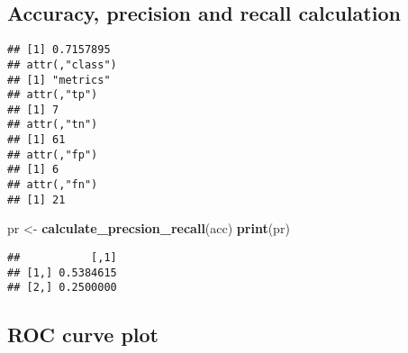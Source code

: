 \documentclass[
]{article}
\newenvironment{Shaded}{\begin{snugshade}}{\end{snugshade}}
\newcommand{\AttributeTok}[1]{\textcolor[rgb]{0.13,0.29,0.53}{#1}}
\newcommand{\DecValTok}[1]{\textcolor[rgb]{0.00,0.00,0.81}{#1}}
\newcommand{\FloatTok}[1]{\textcolor[rgb]{0.00,0.00,0.81}{#1}}
\newcommand{\FunctionTok}[1]{\textcolor[rgb]{0.13,0.29,0.53}{\textbf{#1}}}
\newcommand{\NormalTok}[1]{#1}
\newcommand{\OtherTok}[1]{\textcolor[rgb]{0.56,0.35,0.01}{#1}}
\newcommand{\SpecialCharTok}[1]{\textcolor[rgb]{0.81,0.36,0.00}{\textbf{#1}}}
\begin{document}
\hypertarget{accuracy-precision-and-recall-calculation}{%
\subsection{Accuracy, precision and recall
calculation}\label{accuracy-precision-and-recall-calculation}}

\begin{Shaded}
\end{Shaded}

\begin{verbatim}
## [1] 0.7157895
## attr(,"class")
## [1] "metrics"
## attr(,"tp")
## [1] 7
## attr(,"tn")
## [1] 61
## attr(,"fp")
## [1] 6
## attr(,"fn")
## [1] 21
\end{verbatim}

\begin{Shaded}
\begin{Highlighting}[]
\NormalTok{pr }\OtherTok{\textless{}{-}} \FunctionTok{calculate\_precsion\_recall}\NormalTok{(acc)}
\FunctionTok{print}\NormalTok{(pr)}
\end{Highlighting}
\end{Shaded}

\begin{verbatim}
##           [,1]
## [1,] 0.5384615
## [2,] 0.2500000
\end{verbatim}

\hypertarget{roc-curve-plot}{%
\subsection{ROC curve plot}\label{roc-curve-plot}}

\begin{Shaded}
\end{Shaded}
\end{document}
